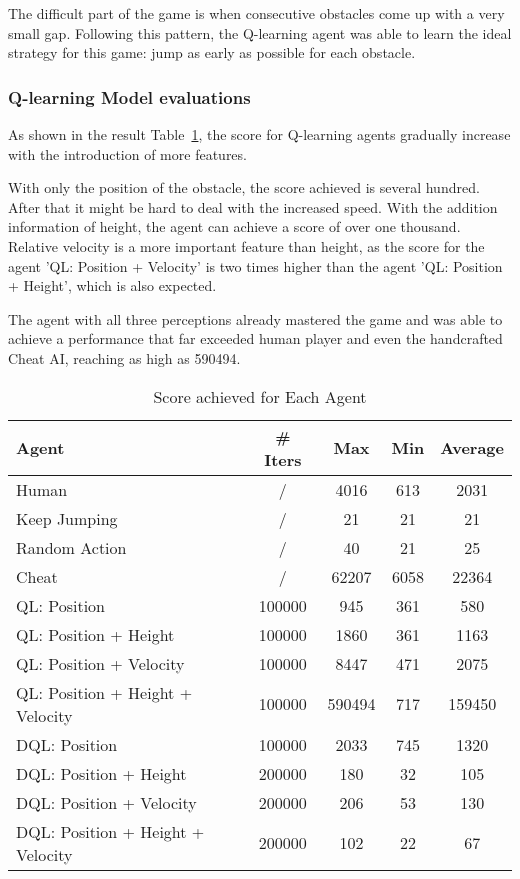 \documentclass[conference]{IEEEtran}
\begin{document}
    The difficult part of the game is when consecutive obstacles come up with a very small gap. Following this pattern, the Q-learning agent was able to learn the ideal strategy for this game: jump as early as possible for each obstacle.
    
\subsubsection{Q-learning Model evaluations}
    As shown in the result Table~\ref{tab:scores}, the score for Q-learning agents gradually increase with the introduction of more features. 
    
    With only the position of the obstacle, the score achieved is several hundred. After that it might be hard to deal with the increased speed. With the addition information of height, the agent can achieve a score of over one thousand. Relative velocity is a more important feature than height, as the score for the agent 'QL: Position + Velocity' is two times higher than the agent 'QL: Position + Height', which is also expected.
    
    The agent with all three perceptions already mastered the game and was able to achieve a performance that far exceeded human player and even the handcrafted Cheat AI, reaching as high as 590494.

\begin{table}[!t]
\renewcommand{\arraystretch}{1.3}
\caption{Score achieved for Each Agent}
\label{tab:scores}
\centering
\begin{tabular}{l c c c c}
\hline
Agent & \# Iters & Max & Min & Average\\
\hline
Human & / & 4016 & 613 & 2031 \\
\hline
Keep Jumping & / & 21 & 21 & 21 \\
\hline
Random Action & / & 40 & 21 & 25 \\
\hline
Cheat & / & 62207 & 6058 & 22364 \\
\hline
QL: Position & 100000 & 945 & 361 & 580 \\
\hline
QL: Position + Height & 100000 & 1860 & 361 & 1163 \\
\hline
QL: Position + Velocity & 100000  & 8447 & 471 & 2075 \\
\hline
QL: Position + Height + Velocity & 100000  & 590494 & 717 & 159450 \\
\hline
DQL: Position & 100000 & 2033 & 745 & 1320 \\
\hline
DQL: Position + Height & 200000 & 180 & 32 & 105 \\
\hline
DQL: Position + Velocity & 200000  & 206 & 53 & 130 \\
\hline
DQL: Position + Height + Velocity & 200000  & 102 & 22 & 67 \\
\hline
\end{tabular}
\end{table}
\end{document}
